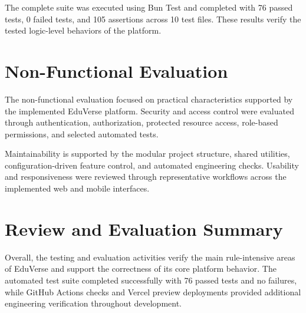 The complete suite was executed using Bun Test and completed with 76 passed
tests, 0 failed tests, and 105 assertions across 10 test files. These results
verify the tested logic-level behaviors of the platform.

\section{Non-Functional Evaluation}\label{sec:non_functional_evaluation}

The non-functional evaluation focused on practical characteristics supported
by the implemented EduVerse platform. Security and access control were
evaluated through authentication, authorization, protected resource access,
role-based permissions, and selected automated tests.

Maintainability is supported by the modular project structure, shared
utilities, configuration-driven feature control, and automated engineering
checks. Usability and responsiveness were reviewed through representative
workflows across the implemented web and mobile interfaces.

\section{Review and Evaluation Summary}
\label{sec:review_evaluation_summary}

Overall, the testing and evaluation activities verify the main rule-intensive
areas of EduVerse and support the correctness of its core platform behavior.
The automated test suite completed successfully with 76 passed tests and no
failures, while GitHub Actions checks and Vercel preview deployments provided
additional engineering verification throughout development.

